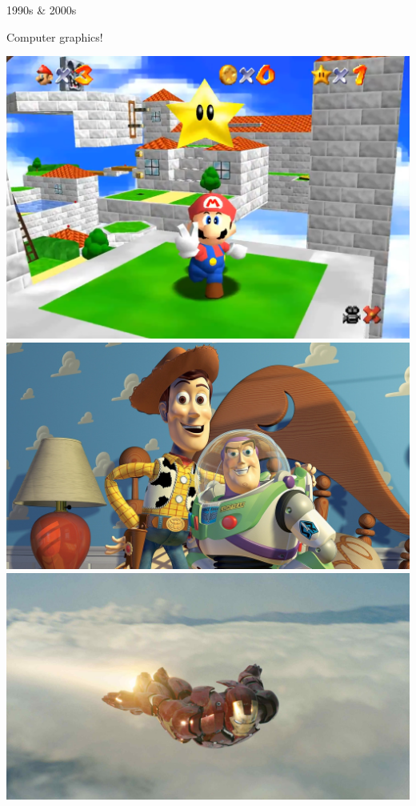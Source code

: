 \documentclass{lug}
\begin{document}
\begin{frame}{1990s \& 2000s}
    \noindent
    \begin{minipage}{.65\textwidth}
        Computer graphics!
    \end{minipage}%
    \begin{minipage}{.35\textwidth}
        \includegraphics[width=\textwidth]{graphics/supermario64} \\
        \includegraphics[width=\textwidth]{graphics/toy_story} \\
        \includegraphics[width=\textwidth]{graphics/iron_man_2008}
    \end{minipage}
\end{frame}
\end{document}
